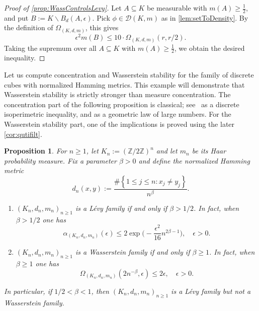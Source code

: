 \documentclass{amsart}
\numberwithin{equation}{subsection}
\theoremstyle{plain}
\newtheorem{prop}[prop]{Proposition}
\theoremstyle{definition}
\theoremstyle{plain}
\begin{document}
\begin{proof}[Proof of \cref{prop:WassControlsLevy}]
Let \(A\subseteq K\) be measurable with \(m\left(A\right)\geq\frac{1}{2}\), and put \(B:=K\backslash B_{d}\left(A,\epsilon\right)\). Pick \(\phi\in\mathcal{D}\left(K,m\right)\) as in \cref{lem:setToDensity}. By the definition of \(\Omega_{\left(K,d,m\right)}\), this gives
\[\epsilon^{2}m\left(B\right)\leq10\cdot\Omega_{\left(K,d,m\right)}\left(r,r/2\right).\]
Taking the supremum over all \(A\subseteq K\) with \(m\left(A\right)\geq\frac{1}{2}\), we obtain the desired inequality.
\end{proof}

Let us compute concentration and Wasserstein stability for the family of discrete cubes with normalized Hamming metrics. This example will demonstrate that Wasserstein stability is strictly stronger than measure concentration. The concentration part of the following proposition is classical; see~\cite[Exm.~2.3, \S4.A.4]{milman1988heritage} as a discrete isoperimetric inequality, and \cite[p.~5, Exm.~4.3.7]{Pestov2006} as a geometric law of large numbers. For the Wasserstein stability part, one of the implications is proved using the later \cref{cor:qutifilt}.

\begin{prop}\label{prop:cubes}
For \(n\geq 1\), let \(K_{n}:=\left(\mathbb{Z}/2\mathbb{Z}\right)^{n}\) and let \(m_{n}\) be its Haar probability measure. Fix a parameter \(\beta>0\) and define the normalized Hamming metric
\[d_{n}\left(x,y\right):=\frac{\#\left\{1\leq j\leq n:x_{j}\neq y_{j}\right\}}{n^{\beta}}.\]
\begin{enumerate}
    \item \(\left(K_{n},d_{n},m_{n}\right)_{n\geq1}\) is a L\'{e}vy family if and only if \(\beta>1/2\). In fact, when \(\beta>1/2\) one has
    \[\alpha_{\left(K_{n},d_{n},m_{n}\right)}\left(\epsilon\right)\leq2\exp\Big(-\frac{\epsilon^{2}}{16}n^{2\beta-1}\Big),\quad\epsilon>0.\]
    \item \(\left(K_{n},d_{n},m_{n}\right)_{n\geq1}\) is a Wasserstein family if and only if \(\beta\geq 1\). In fact, when \(\beta\geq 1\) one has
    \[\Omega_{\left(K_{n},d_{n},m_{n}\right)}\left(2n^{-\beta},\epsilon\right)\leq2\epsilon,\quad\epsilon>0.\]
\end{enumerate}
In particular, if \(1/2<\beta<1\), then \(\left(K_{n},d_{n},m_{n}\right)_{n\geq 1}\) is a L\'{e}vy family but not a Wasserstein family.
\end{prop}
\end{document}
